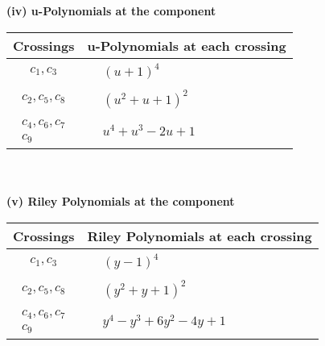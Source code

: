 \documentclass[1p]{elsarticle_modified}
\theoremstyle{definition}
\begin{document}
\newpage\renewcommand{\arraystretch}{1}
\flushleft \textbf{(iv) u-Polynomials at the component}\newline \\
\begin{tabular}{m{50pt}|m{274pt}}
Crossings & \hspace{64pt}u-Polynomials at each crossing \\
\hline $$\begin{aligned}c_{1},c_{3}\end{aligned}$$&$\begin{aligned}
&(u+1)^4
\end{aligned}$\\
\hline $$\begin{aligned}c_{2},c_{5},c_{8}\end{aligned}$$&$\begin{aligned}
&(u^2+u+1)^2
\end{aligned}$\\
\hline $$\begin{aligned}c_{4},c_{6},c_{7}\\c_{9}\end{aligned}$$&$\begin{aligned}
&u^4+u^3-2 u+1
\end{aligned}$\\
\hline
\end{tabular}\\~\\
\newpage\renewcommand{\arraystretch}{1}
\flushleft \textbf{(v) Riley Polynomials at the component}\newline \\
\begin{tabular}{m{50pt}|m{274pt}}
Crossings & \hspace{64pt}Riley Polynomials at each crossing \\
\hline $$\begin{aligned}c_{1},c_{3}\end{aligned}$$&$\begin{aligned}
&(y-1)^4
\end{aligned}$\\
\hline $$\begin{aligned}c_{2},c_{5},c_{8}\end{aligned}$$&$\begin{aligned}
&(y^2+y+1)^2
\end{aligned}$\\
\hline $$\begin{aligned}c_{4},c_{6},c_{7}\\c_{9}\end{aligned}$$&$\begin{aligned}
&y^4- y^3+6 y^2-4 y+1
\end{aligned}$\\
\hline
\end{tabular}\\~\\
\end{document}
